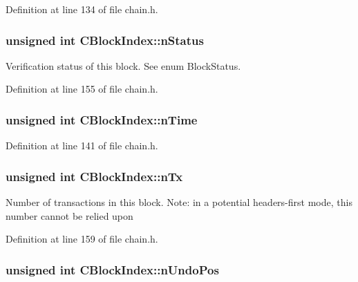 Definition at line 134 of file chain.\+h.

\hypertarget{class_c_block_index_ac5a336b45ca70e3ed2fc090bf2ee3011}{}
\subsubsection[{n\+Status}]{\setlength{\rightskip}{0pt plus 5cm}unsigned int C\+Block\+Index\+::n\+Status}\label{class_c_block_index_ac5a336b45ca70e3ed2fc090bf2ee3011}


Verification status of this block. See enum Block\+Status. 



Definition at line 155 of file chain.\+h.

\hypertarget{class_c_block_index_a4b687a226e9e166b0f91c1b616b543a6}{}
\subsubsection[{n\+Time}]{\setlength{\rightskip}{0pt plus 5cm}unsigned int C\+Block\+Index\+::n\+Time}\label{class_c_block_index_a4b687a226e9e166b0f91c1b616b543a6}


Definition at line 141 of file chain.\+h.

\hypertarget{class_c_block_index_ac8e219a377839d2f9133a4387f46e44e}{}
\subsubsection[{n\+Tx}]{\setlength{\rightskip}{0pt plus 5cm}unsigned int C\+Block\+Index\+::n\+Tx}\label{class_c_block_index_ac8e219a377839d2f9133a4387f46e44e}
Number of transactions in this block. Note\+: in a potential headers-\/first mode, this number cannot be relied upon 

Definition at line 159 of file chain.\+h.

\hypertarget{class_c_block_index_a865ddd56406c23e98cdc61511a61eb64}{}
\subsubsection[{n\+Undo\+Pos}]{\setlength{\rightskip}{0pt plus 5cm}unsigned int C\+Block\+Index\+::n\+Undo\+Pos}\label{class_c_block_index_a865ddd56406c23e98cdc61511a61eb64}


